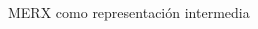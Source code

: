 \begin{frame}{MERX como representaci\'on intermedia}
\begin{columns}[T]
\begin{column}{0.48\linewidth}
            
            
            


        \end{column}
        
    \end{columns}
\end{frame}